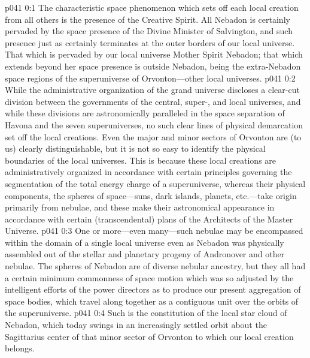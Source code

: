 \author{Archangel}
\vs p041 0:1 The characteristic space phenomenon which sets off each local creation from all others is the presence of the Creative Spirit. All Nebadon is certainly pervaded by the space presence of the Divine Minister of Salvington, and such presence just as certainly terminates at the outer borders of our local universe. That which is pervaded by our local universe Mother Spirit  Nebadon; that which extends beyond her space presence is outside Nebadon, being the extra\hyp{}Nebadon space regions of the superuniverse of Orvonton---other local universes.
\pc \vs p041 0:2 While the administrative organization of the grand universe discloses a clear\hyp{}cut division between the governments of the central, super-, and local universes, and while these divisions are astronomically paralleled in the space separation of Havona and the seven superuniverses, no such clear lines of physical demarcation set off the local creations. Even the major and minor sectors of Orvonton are (to us) clearly distinguishable, but it is not so easy to identify the physical boundaries of the local universes. This is because these local creations are administratively organized in accordance with certain  principles governing the segmentation of the total energy charge of a superuniverse, whereas their physical components, the spheres of space---suns, dark islands, planets, etc.---take origin primarily from nebulae, and these make their astronomical appearance in accordance with certain  (transcendental) plans of the Architects of the Master Universe.
\vs p041 0:3 One or more---even many---such nebulae may be encompassed within the domain of a single local universe even as Nebadon was physically assembled out of the stellar and planetary progeny of Andronover and other nebulae. The spheres of Nebadon are of diverse nebular ancestry, but they all had a certain minimum commonness of space motion which was so adjusted by the intelligent efforts of the power directors as to produce our present aggregation of space bodies, which travel along together as a contiguous unit over the orbits of the superuniverse.
\vs p041 0:4 Such is the constitution of the local star cloud of Nebadon, which today swings in an increasingly settled orbit about the Sagittarius center of that minor sector of Orvonton to which our local creation belongs.

